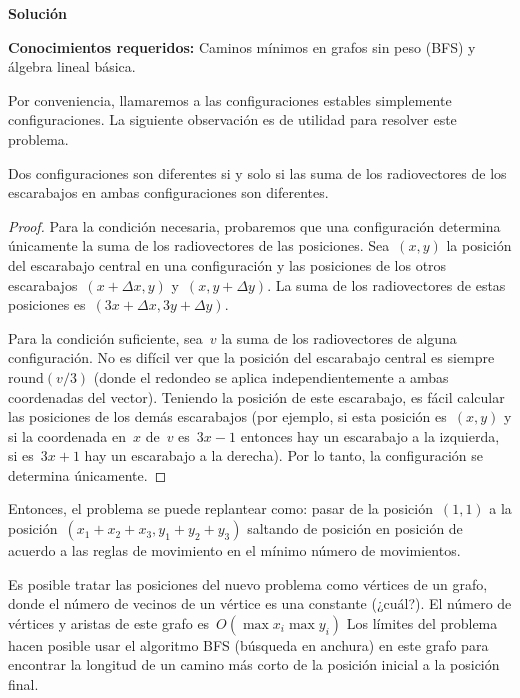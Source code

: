 \vspace*{0cm}
{\Large\textbf{Solución}}

\textbf{Conocimientos requeridos:} Caminos mínimos en grafos sin peso (BFS) y álgebra
lineal básica.

Por conveniencia, llamaremos a las configuraciones estables simplemente
configuraciones. La siguiente observación es de utilidad para resolver este problema.

\begin{proposition*}
  Dos configuraciones son diferentes si y solo si las suma de los radiovectores de
  los escarabajos en ambas configuraciones son diferentes.
\end{proposition*}
\begin{proof}
Para la condición necesaria, probaremos que una configuración determina únicamente
la suma de los radiovectores de las posiciones. Sea~$(x, y)$ la posición del
escarabajo central en una configuración y las posiciones de los otros
escarabajos~$(x + \Delta x, y)$ y~$(x, y + \Delta y)$. La suma de los radiovectores
de estas posiciones es~$(3x + \Delta x, 3y + \Delta y)$.

Para la condición suficiente, sea~$v$ la suma de los radiovectores de alguna
configuración. No es difícil ver que la posición del escarabajo central es
siempre~$\text{round}(v / 3)$ (donde el redondeo se aplica independientemente a ambas
coordenadas del vector). Teniendo la posición de este escarabajo, es fácil calcular
las posiciones de los demás escarabajos (por ejemplo, si esta posición es~$(x, y)$ y
si la coordenada en~$x$ de~$v$ es~$3x - 1$ entonces hay un escarabajo a la izquierda,
si es~$3x + 1$ hay un escarabajo a la derecha). Por lo tanto, la configuración se
determina únicamente.
\end{proof}

Entonces, el problema se puede replantear como: pasar de la posición~$(1, 1)$ a la
posición~$(x_1 + x_2 + x_3, y_1 + y_2 + y_3)$ saltando de posición en posición de
acuerdo a las reglas de movimiento en el mínimo número de movimientos.

Es posible tratar las posiciones del nuevo problema como vértices de un grafo, donde
el número de vecinos de un vértice es una constante (¿cuál?). El número de vértices y
aristas de este grafo es~$O(\max x_i \max y_i)$ Los límites del problema hacen posible usar el
algoritmo BFS (búsqueda en anchura) en este grafo para encontrar la longitud de un
camino más corto de la posición inicial a la posición final.

